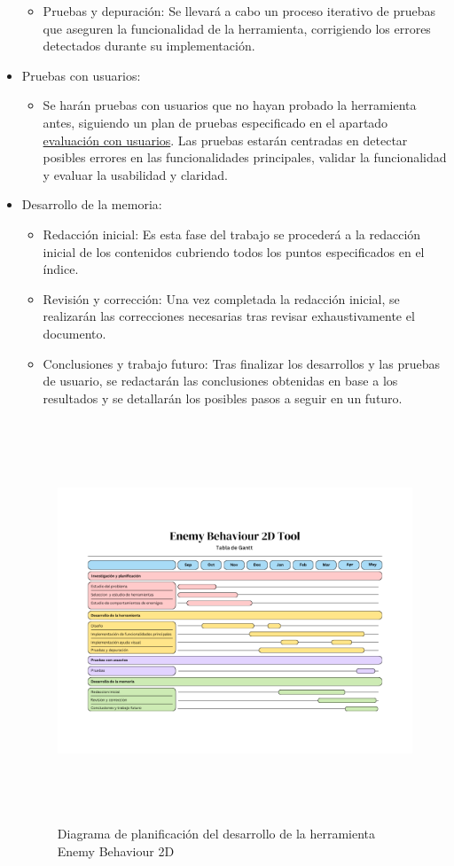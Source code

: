 \begin{itemize}
\begin{itemize}
	    \item Pruebas y depuración: Se llevará a cabo un proceso iterativo de pruebas que aseguren la funcionalidad de la herramienta, corrigiendo los errores detectados durante su implementación.
	\end{itemize}
   \item Pruebas con usuarios:
	\begin{itemize}
	    \item Se harán pruebas con usuarios que no hayan probado la herramienta antes, siguiendo un plan de pruebas especificado en el apartado \hyperref[cap:evaluacionConUsuarios]{evaluación con usuarios}. Las pruebas estarán centradas en detectar posibles errores en las funcionalidades principales, validar la funcionalidad y evaluar la usabilidad y claridad.
	\end{itemize}
   \item Desarrollo de la memoria: 
	\begin{itemize}
	    \item  Redacción inicial: Es esta fase del trabajo se procederá a la redacción inicial de los contenidos cubriendo todos los puntos especificados en el índice.
	    \item Revisión y corrección: Una vez completada la redacción inicial, se realizarán las correcciones necesarias tras revisar exhaustivamente el documento.
	    \item Conclusiones y trabajo futuro: Tras finalizar los desarrollos y las pruebas de usuario, se redactarán las conclusiones obtenidas en base a los resultados y se detallarán los posibles pasos a seguir en un futuro.
	\end{itemize}
\begin{figure}[h!]
	\centering
	\includegraphics[height=12cm]{Imagenes/GanttChart}
	\caption{Diagrama de planificación del desarrollo de la herramienta Enemy Behaviour 2D}
	\label{fig:GanttEnemyBehaviour2D}
\end{figure}

\end{itemize}
